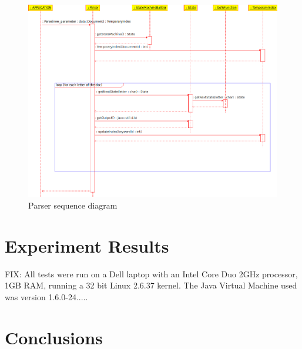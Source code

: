 \documentclass[10pt]{report}
\begin{document}
\begin{figure}
  \begin{center}
	\includegraphics[width=\textwidth,height=!]{parsersequencediagram}
  \end{center}
  \caption{Parser sequence diagram}
  \label{fig:parsersequencediagram}
\end{figure} 


\section{Experiment Results}
\label{sec:experimentresults}
FIX: All tests were run on a Dell laptop with an Intel Core Duo 2GHz
processor, 1GB RAM, running a 32 bit Linux 2.6.37 kernel. The Java
Virtual Machine used was version 1.6.0-24.....


\section{Conclusions}
\label{sec:conclusions}


\renewcommand\bibname{References}




\end{document}
